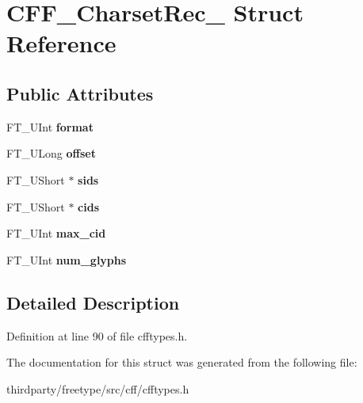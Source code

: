 \hypertarget{struct_c_f_f___charset_rec__}{}\section{C\+F\+F\+\_\+\+Charset\+Rec\+\_\+ Struct Reference}
\label{struct_c_f_f___charset_rec__}
\subsection*{Public Attributes}
\begin{DoxyCompactItemize}
\item 
\mbox{\label{struct_c_f_f___charset_rec___a5f8d1ab5598564a2ba1a444db320e0d5}} 
F\+T\+\_\+\+U\+Int {\bfseries format}
\item 
\mbox{\label{struct_c_f_f___charset_rec___accf21fc6bd1e7e36b7d4beca041f4a3f}} 
F\+T\+\_\+\+U\+Long {\bfseries offset}
\item 
\mbox{\label{struct_c_f_f___charset_rec___a1a8b95d80a18ebb7b02b2ab3aaa672e7}} 
F\+T\+\_\+\+U\+Short $\ast$ {\bfseries sids}
\item 
\mbox{\label{struct_c_f_f___charset_rec___a54f2abbf89cfe39f8f52593e99936033}} 
F\+T\+\_\+\+U\+Short $\ast$ {\bfseries cids}
\item 
\mbox{\label{struct_c_f_f___charset_rec___ae4fedec603fadfe5386dc611b7dba137}} 
F\+T\+\_\+\+U\+Int {\bfseries max\+\_\+cid}
\item 
\mbox{\label{struct_c_f_f___charset_rec___a41eeac7d0397d81a605279cb39b7fcbc}} 
F\+T\+\_\+\+U\+Int {\bfseries num\+\_\+glyphs}
\end{DoxyCompactItemize}


\subsection{Detailed Description}


Definition at line 90 of file cfftypes.\+h.



The documentation for this struct was generated from the following file\+:\begin{DoxyCompactItemize}
\item 
thirdparty/freetype/src/cff/cfftypes.\+h\end{DoxyCompactItemize}
